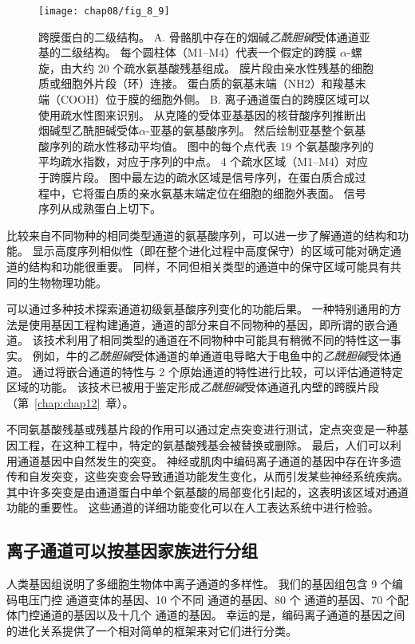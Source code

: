 \begin{figure}[htbp]
	\centering
	\texttt{[image: chap08/fig\_8\_9]}
	\caption{跨膜蛋白的二级结构。
		A. 骨骼肌中存在的烟碱\textit{乙酰胆碱}受体通道亚基的二级结构。
		每个圆柱体（M1–M4）代表一个假定的跨膜 $\alpha$-螺旋，由大约 20 个疏水氨基酸残基组成。
		膜片段由亲水性残基的细胞质或细胞外片段（环）连接。
		蛋白质的氨基末端（NH2）和羧基末端（COOH）位于膜的细胞外侧。
		B. 离子通道蛋白的跨膜区域可以使用疏水性图来识别。
		从克隆的受体亚基基因的核苷酸序列推断出烟碱型乙酰胆碱受体$\alpha$-亚基的氨基酸序列。
		然后绘制亚基整个氨基酸序列的疏水性移动平均值。
		图中的每个点代表 19 个氨基酸序列的平均疏水指数，对应于序列的中点。
		4 个疏水区域（M1–M4）对应于跨膜片段。
		图中最左边的疏水区域是信号序列，在蛋白质合成过程中，它将蛋白质的亲水氨基末端定位在细胞的细胞外表面。
		信号序列从成熟蛋白上切下\cite{schofield1987sequence}。}
	\label{fig:8_9}
\end{figure}


比较来自不同物种的相同类型通道的氨基酸序列，可以进一步了解通道的结构和功能。
显示高度序列相似性（即在整个进化过程中高度保守）的区域可能对确定通道的结构和功能很重要。
同样，不同但相关类型的通道中的保守区域可能具有共同的生物物理功能。


可以通过多种技术探索通道初级氨基酸序列变化的功能后果。
一种特别通用的方法是使用基因工程构建通道，通道的部分来自不同物种的基因，即所谓的嵌合通道。
该技术利用了相同类型的通道在不同物种中可能具有稍微不同的特性这一事实。
例如，牛的\textit{乙酰胆碱}受体通道的单通道电导略大于电鱼中的\textit{乙酰胆碱}受体通道。
通过将嵌合通道的特性与 2 个原始通道的特性进行比较，可以评估通道特定区域的功能。
该技术已被用于鉴定形成\textit{乙酰胆碱}受体通道孔内壁的跨膜片段（第~\ref{chap:chap12}~章）。


不同氨基酸残基或残基片段的作用可以通过定点突变进行测试，定点突变是一种基因工程，在这种工程中，特定的氨基酸残基会被替换或删除。
最后，人们可以利用通道基因中自然发生的突变。
神经或肌肉中编码离子通道的基因中存在许多遗传和自发突变，这些突变会导致通道功能发生变化，从而引发某些神经系统疾病。
其中许多突变是由通道蛋白中单个氨基酸的局部变化引起的，这表明该区域对通道功能的重要性。
这些通道的详细功能变化可以在人工表达系统中进行检验。



\subsection{离子通道可以按基因家族进行分组}

人类基因组说明了多细胞生物体中离子通道的多样性。 我们的基因组包含 9 个编码电压门控  通道变体的基因、10 个不同  通道的基因、80 个  通道的基因、70 个配体门控通道的基因以及十几个  通道的基因。
幸运的是，编码离子通道的基因之间的进化关系提供了一个相对简单的框架来对它们进行分类。


